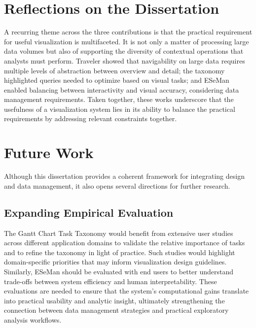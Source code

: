 \begin{refsection}
\section{Reflections on the Dissertation}

A recurring theme across the three contributions is that the practical requirement for useful visualization is multifaceted. It is not only a matter of processing large data volumes but also of supporting the diversity of contextual operations that analysts must perform. Traveler showed that navigability on large data requires multiple levels of abstraction between overview and detail; the taxonomy highlighted queries needed to optimize based on visual tasks; and ESeMan enabled balancing between interactivity and visual accuracy, considering data management requirements. Taken together, these works underscore that the usefulness of a visualization system lies in its ability to balance the practical requirements by addressing relevant constraints together.

\section{Future Work}

Although this dissertation provides a coherent framework for integrating design and data management, it also opens several directions for further research.  

\subsection{Expanding Empirical Evaluation}
The Gantt Chart Task Taxonomy would benefit from extensive user studies across different application domains to validate the relative importance of tasks and to refine the taxonomy in light of practice. Such studies would highlight domain-specific priorities that may inform visualization design guidelines. Similarly, ESeMan should be evaluated with end users to better understand trade-offs between system efficiency and human interpretability. These evaluations are needed to ensure that the system's computational gains translate into practical usability and analytic insight, ultimately strengthening the connection between data management strategies and practical exploratory analysis workflows.


\end{refsection}
